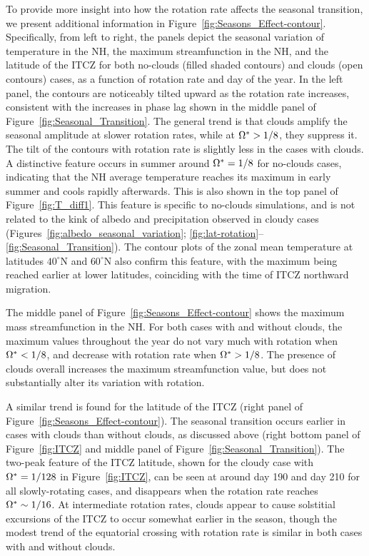 To provide more insight into how the rotation rate affects the seasonal transition, we present additional information in Figure~\ref{fig:Seasons_Effect-contour}. Specifically, from left to right, the panels depict the seasonal variation of temperature in the NH, the maximum streamfunction in the NH, and the latitude of the ITCZ for both no-clouds (filled shaded contours) and clouds (open contours) cases, as a function of rotation rate and day of the year. In the left panel, the contours are noticeably tilted upward as the rotation rate increases, consistent with the increases in phase lag shown in the middle panel of Figure~\ref{fig:Seasonal_Transition}. The general trend is that clouds amplify the seasonal amplitude at slower rotation rates, while at $\Omega^*>1/8$, they suppress it. The tilt of the contours with rotation rate is slightly less in the cases with clouds. A distinctive feature occurs in summer around $\Omega^*=1/8$ for no-clouds cases, indicating that the NH average temperature reaches its maximum in early summer and cools rapidly afterwards. This is also shown in the top panel of Figure~\ref{fig:T_diff1}. This feature is specific to no-clouds simulations, and is not related to the kink of albedo and precipitation observed in cloudy cases (Figures~\ref{fig:albedo_seasonal_variation}; \ref{fig:lat-rotation}--\ref{fig:Seasonal_Transition}). The contour plots of the zonal mean temperature at latitudes $40^\circ$N and $60^\circ$N also confirm this feature, with the maximum being reached earlier at lower latitudes, coinciding with the time of ITCZ northward migration.


The middle panel of Figure~\ref{fig:Seasons_Effect-contour} shows the maximum mass streamfunction in the NH. For both cases with and without clouds, the maximum values throughout the year do not vary much with rotation when $\Omega^*<1/8$, and decrease with rotation rate when $\Omega^*>1/8$. The presence of clouds overall increases the maximum streamfunction value, but does not substantially alter its variation with rotation.

A similar trend is found for the latitude of the ITCZ (right panel of Figure~\ref{fig:Seasons_Effect-contour}). The seasonal transition occurs earlier in cases with clouds than without clouds, as discussed above (right bottom panel of Figure~\ref{fig:ITCZ} and middle panel of Figure~\ref{fig:Seasonal_Transition}). The two-peak feature of the ITCZ latitude, shown for the cloudy case with $\Omega^*=1/128$ in Figure~\ref{fig:ITCZ}, can be seen at around day 190 and day 210 for all slowly-rotating cases, and disappears when the rotation rate reaches $\Omega^*\sim1/16$. At intermediate rotation rates, clouds appear to cause solstitial excursions of the ITCZ to occur somewhat earlier in the season, though the modest trend of the equatorial crossing with rotation rate is similar in both cases with and without clouds.

